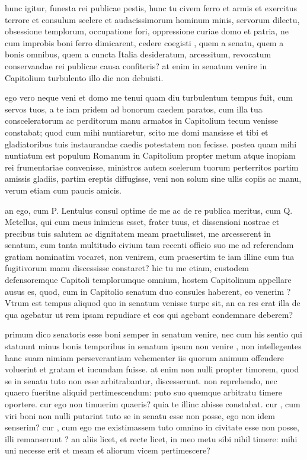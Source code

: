  hunc igitur, funesta rei publicae pestis, hunc tu civem ferro et armis et exercitus terrore et consulum scelere et audacissimorum hominum minis, servorum dilectu, obsessione templorum, occupatione fori, oppressione curiae domo et patria, ne cum improbis boni ferro dimicarent, cedere coegisti , quem a senatu, quem a bonis omnibus, quem a cuncta Italia desideratum, arcessitum, revocatum conservandae rei publicae causa confiteris? at enim in senatum venire in Capitolium turbulento illo die non debuisti.

 ego vero neque veni et domo me tenui quam diu turbulentum tempus fuit, cum servos tuos, a te iam pridem ad bonorum caedem paratos, cum illa tua consceleratorum ac perditorum manu armatos in Capitolium tecum venisse constabat; quod cum mihi nuntiaretur, scito me domi mansisse et tibi et gladiatoribus tuis instaurandae caedis potestatem non fecisse. postea quam mihi nuntiatum est populum Romanum in Capitolium propter metum atque inopiam rei frumentariae convenisse, ministros autem scelerum tuorum perterritos partim amissis gladiis, partim ereptis diffugisse, veni non solum sine ullis copiis ac manu, verum etiam cum paucis amicis.

 an ego, cum P. Lentulus consul optime de me ac de re publica meritus, cum Q. Metellus, qui cum meus inimicus esset, frater tuus, et dissensioni nostrae et precibus tuis salutem ac dignitatem meam praetulisset, me arcesserent in senatum, cum tanta multitudo civium tam recenti officio suo me ad referendam gratiam nominatim vocaret, non venirem, cum praesertim te iam illinc cum tua fugitivorum manu discessisse constaret? hic tu me etiam, custodem defensoremque Capitoli templorumque omnium, hostem Capitolinum appellare ausus es, quod, cum in Capitolio senatum duo consules haberent, eo venerim ? Vtrum est tempus aliquod quo in senatum venisse turpe sit, an ea res erat illa de qua agebatur ut rem ipsam repudiare et eos qui agebant condemnare deberem?

 primum dico senatoris esse boni semper in senatum venire, nec cum his sentio qui statuunt minus bonis temporibus in senatum ipsum non venire , non intellegentes hanc suam nimiam perseverantiam vehementer iis quorum animum offendere voluerint et gratam et iucundam fuisse. at enim non nulli propter timorem, quod se in senatu tuto non esse arbitrabantur, discesserunt. non reprehendo, nec quaero fueritne aliquid pertimescendum: puto suo quemque arbitratu timere oportere. cur ego non timuerim quaeris? quia te illinc abisse constabat. cur , cum viri boni non nulli putarint tuto se in senatu esse non posse, ego non idem senserim? cur , cum ego me existimassem tuto omnino in civitate esse non posse, illi remanserunt ? an aliis licet, et recte licet, in meo metu sibi nihil timere: mihi uni necesse erit et meam et aliorum vicem pertimescere?

